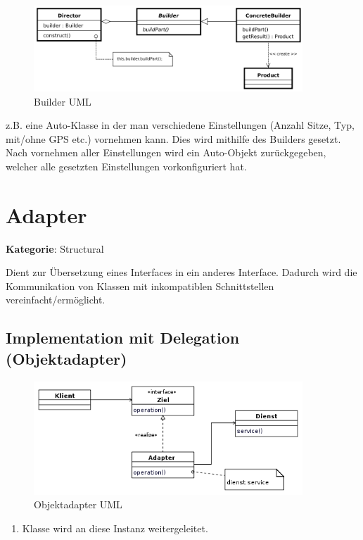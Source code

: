 \begin{figure}[H]
	\centering
	\includegraphics[width=0.9\textwidth]{content/gof/images/04-builder-uml.png}
	\caption{Builder UML}
\end{figure}


z.B. eine Auto-Klasse in der man verschiedene Einstellungen (Anzahl Sitze, Typ, mit/ohne GPS etc.) vornehmen kann. Dies wird mithilfe des Builders gesetzt. Nach vornehmen aller Einstellungen wird ein Auto-Objekt zurückgegeben, welcher alle gesetzten Einstellungen vorkonfiguriert hat.

\section{Adapter}
\textbf{Kategorie}: Structural

Dient zur Übersetzung eines Interfaces in ein anderes Interface. Dadurch wird die Kommunikation von Klassen mit inkompatiblen Schnittstellen vereinfacht/ermöglicht.


\subsection*{Implementation mit Delegation (Objektadapter)}

\begin{figure}[H]
	\centering
	\includegraphics[width=0.9\textwidth]{content/gof/images/05-adapter-delegation-uml.png}
	\caption{Objektadapter UML}
\end{figure}


\begin{enumerate}
	\item Klasse wird an diese Instanz weitergeleitet.
\end{enumerate}


